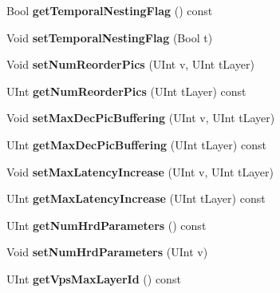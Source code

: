 \begin{DoxyCompactItemize}
Bool {\bfseries get\+Temporal\+Nesting\+Flag} () const
\item 
\mbox{\label{class_t_com_v_p_s_abd3ce21e4756ada7d0b3590f350684a1}} 
Void {\bfseries set\+Temporal\+Nesting\+Flag} (Bool t)
\item 
\mbox{\label{class_t_com_v_p_s_ab9c54648ca873c20e6c3198d32f188b3}} 
Void {\bfseries set\+Num\+Reorder\+Pics} (U\+Int v, U\+Int t\+Layer)
\item 
\mbox{\label{class_t_com_v_p_s_ab6c07be26f54a12d9b02fe4c61568642}} 
U\+Int {\bfseries get\+Num\+Reorder\+Pics} (U\+Int t\+Layer) const
\item 
\mbox{\label{class_t_com_v_p_s_a1f34cec6ff523ec9d01b295277e683cb}} 
Void {\bfseries set\+Max\+Dec\+Pic\+Buffering} (U\+Int v, U\+Int t\+Layer)
\item 
\mbox{\label{class_t_com_v_p_s_a6c11a703e749e3954f19c733a0e45724}} 
U\+Int {\bfseries get\+Max\+Dec\+Pic\+Buffering} (U\+Int t\+Layer) const
\item 
\mbox{\label{class_t_com_v_p_s_ad0c3d90803aba8a500df97da474b421f}} 
Void {\bfseries set\+Max\+Latency\+Increase} (U\+Int v, U\+Int t\+Layer)
\item 
\mbox{\label{class_t_com_v_p_s_ae3ff3a5bd45cfe28368211bba32df79d}} 
U\+Int {\bfseries get\+Max\+Latency\+Increase} (U\+Int t\+Layer) const
\item 
\mbox{\label{class_t_com_v_p_s_a0818ad87deafa559c1fc89f54fde15d9}} 
U\+Int {\bfseries get\+Num\+Hrd\+Parameters} () const
\item 
\mbox{\label{class_t_com_v_p_s_a5a9aafbb5b0de5ffacdd85693c5ba72f}} 
Void {\bfseries set\+Num\+Hrd\+Parameters} (U\+Int v)
\item 
\mbox{\label{class_t_com_v_p_s_a7c58ccb58650f5861b24a1df4183cd83}} 
U\+Int {\bfseries get\+Vps\+Max\+Layer\+Id} () const
\item 
\mbox{\label{class_t_com_v_p_s_abcba2f5404af5d488b5f3dd406edfe21}} 

\end{DoxyCompactItemize}
